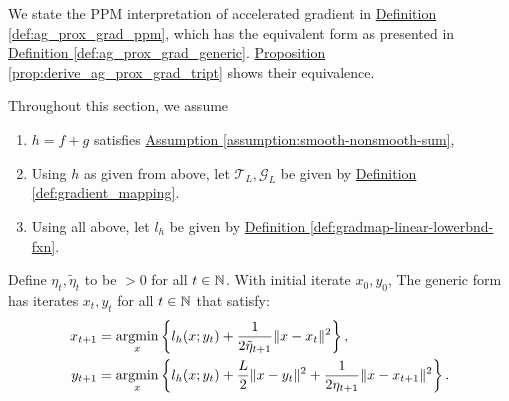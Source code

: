 \documentclass[12pt]{article}
\begin{document}
    \par
    We state the PPM interpretation of accelerated gradient in 
    \hyperref[def:ag_prox_grad_ppm]{Definition \ref*{def:ag_prox_grad_ppm}}, 
    which has the equivalent form as presented in
    \hyperref[def:ag_prox_grad_generic]
    {Definition \ref*{def:ag_prox_grad_generic}}. 
    \hyperref[prop:derive_ag_prox_grad_tript]
    {Proposition \ref*{prop:derive_ag_prox_grad_tript}} 
    shows their equivalence. 
    \par
    Throughout this section, we assume 
    \begin{enumerate}
        \item $h=f + g$ satisfies 
            \hyperref[assumption:smooth-nonsmooth-sum]
            {Assumption \ref*{assumption:smooth-nonsmooth-sum}}, 
        \item Using $h$ as given from above, let $\mathcal T_L, \mathcal G_L$ be given by 
            \hyperref[def:gradient_mapping]
            {Definition \ref*{def:gradient_mapping}}. 
        \item Using all above, let $l_h$ be given by 
            \hyperref[def:gradmap-linear-lowerbnd-fxn]
            {Definition \ref*{def:gradmap-linear-lowerbnd-fxn}}. 
    \end{enumerate}

    \begin{definition}
    \label{def:ag_prox_grad_ppm}
        Define $\eta_t, \tilde \eta_t$ to be $> 0$ for all $t \in \mathbb N$. 
        With initial iterate $x_0, y_0$, 
        The generic form has iterates $x_t, y_t$ for all $t \in \mathbb N$ that satisfy: 
        $$
        \begin{aligned}
            x_{t + 1} &= \mathop{\rm argmin}\limits_{x} \left\lbrace
                l_h(x; y_t) + \frac{1}{2\tilde \eta_{t + 1}} 
                \Vert x - x_t\Vert^2
            \right\rbrace,
            \\
            y_{t + 1}&= 
            \mathop{\rm argmin}\limits_{x}
            \left\lbrace
                l_h(x; y_t) + \frac{L}{2}\Vert x - y_t\Vert^2 + 
                \frac{1}{2\eta_{t + 1}} \Vert x - x_{t + 1}\Vert^2
            \right\rbrace.
        \end{aligned}
        $$
    \end{definition}
\end{document}
